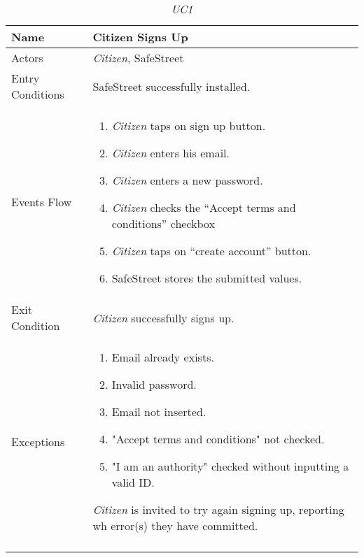 \documentclass[../../../RASD.tex]{subfiles}
\begin{document}
    \newpage
    \begin{center}
        \begin{longtable}{| p{.35\linewidth} | p{.65\linewidth} |}

            \hline
            \textbf{Name} & \textbf{Citizen Signs Up}\\ \hline
            Actors & \textit{Citizen}, SafeStreet\\ \hline
            Entry Conditions & SafeStreet successfully installed.\\ \hline
            Events Flow &
            \begin{enumerate}
                \item \textit{Citizen} taps on sign up button.
                \item \textit{Citizen} enters his email.
                \item \textit{Citizen} enters a new password.
                \item \textit{Citizen} checks the “Accept terms and conditions” checkbox
                \item \textit{Citizen} taps on “create account” button.
                \item SafeStreet stores the submitted values.
            \end{enumerate}
            \\ \hline
            Exit Condition & \textit{Citizen} successfully signs up.\\ \hline
            Exceptions &
            \begin{enumerate}
                \item Email already exists.
                \item Invalid password.
                \item Email not inserted.
                \item "Accept terms and conditions" not checked.
                \item "I am an authority" checked without inputting a valid ID.
            \end{enumerate}
            \textit{Citizen} is invited to try again signing up, reporting wh error(s) they have committed. \\
            \hline
            \caption{\textit{UC1}}
        \end{longtable}
    \end{center}
    \newpage
\end{document}
